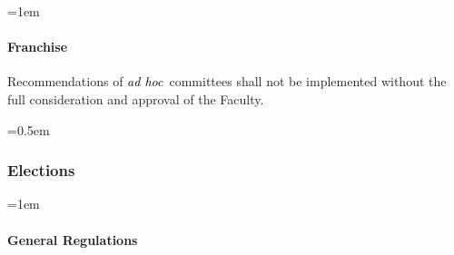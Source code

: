 \documentclass{manual}
\newcommand{\keyword}[1]{\textcolor{black}{#1}}
\newcommand{\adho}{\keyword{\textit{ad hoc}}~}
\let\oldsubsubsection\subsubsection
\renewcommand\subsubsection{\leftskip=0.5em\oldsubsubsection}
\let\oldparagraph\paragraph
\renewcommand\paragraph{\leftskip=1em\oldparagraph}
\newcommand{\itemLevelA}{\alph*.}
\newcommand{\itemRefA}{\alph*}
\begin{document}
\paragraph{Franchise}
Recommendations of \adho committees shall not be implemented without the full consideration and approval of the Faculty.

\subsubsection{Elections}\label{sub:Elections}
\paragraph{General Regulations}\label{par:GeneralRegulations}
\begin{enumerate}[label=\itemLevelA,ref=\itemRefA]


\end{enumerate}
\end{document}
